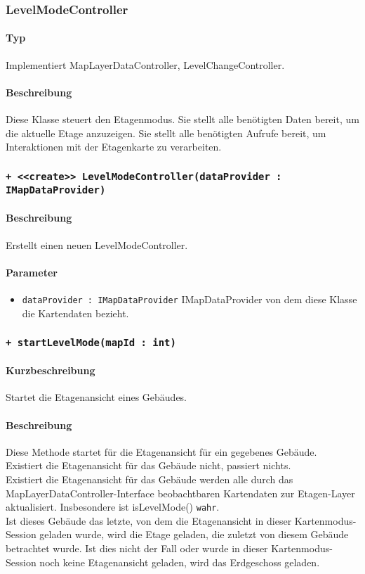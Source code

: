 \subsubsection{LevelModeController}\label{App_Map_ViewModel_LevelModeController}
\paragraph*{Typ}
Implementiert MapLayerDataController, LevelChangeController.
\paragraph*{Beschreibung}
Diese Klasse steuert den Etagenmodus. Sie stellt alle benötigten Daten bereit, um die aktuelle Etage anzuzeigen. 
Sie stellt alle benötigten Aufrufe bereit, um Interaktionen mit der Etagenkarte zu verarbeiten.

\subsubsection*{\texttt{+ <<create>> LevelModeController(dataProvider : IMapDataProvider)}}\label{App_Map_ViewModel_createLevelModeController}%
\paragraph*{Beschreibung}
Erstellt einen neuen LevelModeController.
\paragraph*{Parameter}
\begin{itemize}
    \item \texttt{dataProvider : IMapDataProvider} IMapDataProvider von dem diese Klasse die Kartendaten bezieht.
\end{itemize}

\subsubsection*{\texttt{+ startLevelMode(mapId : int)}}\label{App_Map_ViewModel_startLevelMode}%
\paragraph*{Kurzbeschreibung}
Startet die Etagenansicht eines Gebäudes.
\paragraph*{Beschreibung}
Diese Methode startet für die Etagenansicht für ein gegebenes Gebäude.\\
Existiert die Etagenansicht für das Gebäude nicht, passiert nichts.\\
Existiert die Etagenansicht für das Gebäude werden alle durch das MapLayerDataController-Interface beobachtbaren 
Kartendaten zur Etagen-Layer aktualisiert. Insbesondere ist isLevelMode() \texttt{wahr}.\\
Ist dieses Gebäude das letzte, von dem die Etagenansicht in dieser Kartenmodus-Session geladen wurde, wird die 
Etage geladen, die zuletzt von diesem Gebäude betrachtet wurde.
Ist dies nicht der Fall oder wurde in dieser Kartenmodus-Session noch keine Etagenansicht geladen, wird das Erdgeschoss geladen.
